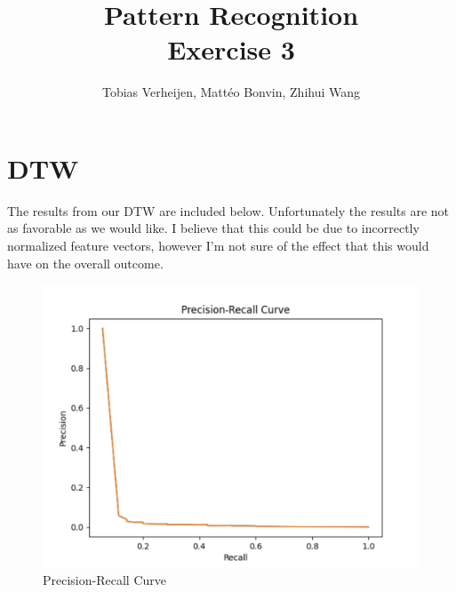 \documentclass{article}
\title{Pattern Recognition \\\Large{Exercise 3}}
\author{Tobias Verheijen, Mattéo Bonvin, Zhihui Wang}
\date{}
\begin{document}
\maketitle

\section{DTW}

The results from our DTW are included below. Unfortunately the results are not as favorable as we would like. I believe that this could be due to incorrectly normalized feature vectors, however I'm not sure of the effect that this would have on the overall outcome.

\begin{figure}
    \centering
    \includegraphics[width=\linewidth]{Precision-Recall.png}
    \caption{Precision-Recall Curve}
    \label{fig:enter-label}
\end{figure}
\end{document}
